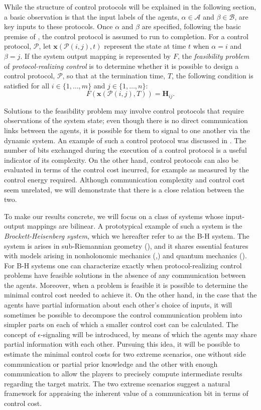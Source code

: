\documentclass[12pt,onecolumn,draftcls]{IEEEtran}
\newcommand{\bx}{\mathbf{x}}
\newcommand{\bH}{\mathbf{H}}
\newcommand{\cA}{\mathcal{A}}
\newcommand{\cB}{\mathcal{B}}
\newcommand{\cP}{\mathcal{P}}
\begin{document}
While the structure of control protocols will be explained in the following section, a basic observation is that the input labels of the agents, $\alpha\in \cA$ and $\beta\in \cB$, are key inputs to these protocols.  Once $\alpha$ and $\beta$ are specified, following the basic premise of \cite{KN}, the control protocol is assumed to run to completion.
For a control
protocol, $\cP$, let $\bx(\cP(i,j),t)$ represent the state at time $t$ when $\alpha=i$ and $\beta=j$.
If the system output mapping is represented by $F$, the {\em feasibility problem} of {\em protocol-realizing control}
is to determine whether it is possible to design a control protocol, $\cP$, so that at the termination time, $T$,
the following condition is satisfied for all $i \in \{1, \ldots, m \}$ and $j \in \{1, \ldots, n \}$:
\begin{equation}
F(\bx(\cP(i,j),T))= \bH_{ij}.
\end{equation}

Solutions to the feasibility problem may involve control protocols that require observations of the
system state; even though there is no direct communication links between the agents, it is possible for
them to signal to one another via the dynamic system.   An example of such a control protocol was
discussed in \cite{WB}.   The number of bits exchanged during the execution of a control protocol
is a useful indicator of its complexity.   On the other hand, control protocols can also be evaluated in terms of the control cost incurred, for example as measured by the control energy required.   Although communication complexity and control cost seem unrelated, we will demonstrate that there is a close relation between the two.

To make our results concrete, we will focus on a class of systems whose input-output mappings are bilinear.   A prototypical example of such a system is the {\em Brockett-Heisenberg system}, which we hereafter refer to as the B-H system. 
The system is arises in  sub-Riemannian geometry  (\cite{rwb1}), and it shares essential features with models arising in nonholonomic mechanics (\cite{RB1},\cite{RB2}) and quantum mechanics (\cite{WB}).  For B-H systems one can characterize exactly when protocol-realizing control problems have feasible solutions in the absence of any communication between the agents.  Moreover, when a problem is feasible it is possible to determine the minimal control cost needed to achieve it.
On the other hand, in the case that the agents have partial information about each other's choice of inputs, it will sometimes be possible to decompose the control communication problem into simpler parts on each of which a smaller control cost can be calculated.  The concept of $\epsilon$-signaling will be introduced, by means of which the agents may share partial information with each other.  Pursuing this idea, it will be possible to estimate the minimal control costs for  two extreme scenarios, one without side communication or partial prior knowledge and the other with enough communication to allow the players to precisely compute intermediate results regarding the target matrix.  The two extreme scenarios suggest a natural framework for appraising the inherent value of a communication bit in terms of control cost.
\end{document}

